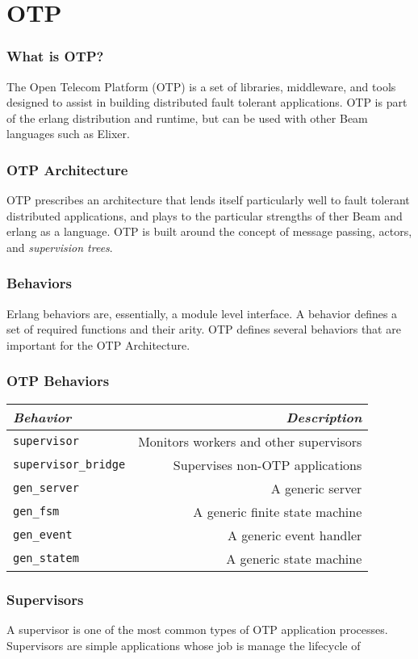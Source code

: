 \documentclass{beamer}
\begin{document}
\section{OTP}

\begin{frame}
  \frametitle{What is OTP?}
  The Open Telecom Platform (OTP) is a set of libraries, middleware,
  and tools designed to assist in building distributed fault tolerant
  applications.  OTP is part of the erlang distribution and runtime,
  but can be used with other Beam languages such as Elixer.
\end{frame}

\begin{frame}
  \frametitle{OTP Architecture}
  OTP prescribes an architecture that lends itself particularly well
  to fault tolerant distributed applications, and plays to the
  particular strengths of ther Beam and erlang as a language.  OTP is
  built around the concept of message passing, actors, and
  \emph{supervision trees}.
\end{frame}

\begin{frame}
  \frametitle{Behaviors}
  Erlang behaviors are, essentially, a module level interface.  A
  behavior defines a set of required functions and their arity.  OTP
  defines several behaviors that are important for the OTP
  Architecture.
\end{frame}

\begin{frame}
  \frametitle{OTP Behaviors}
  \begin{tabular}{|l|r|}
    \hline
    \emph{Behavior} & \emph{Description} \\
    \hline
    {\tt supervisor} & Monitors workers and other supervisors \\
    \hline
    {\tt supervisor\_bridge} & Supervises non-OTP applications \\
    \hline
    {\tt gen\_server} & A generic server \\
    \hline
    {\tt gen\_fsm} & A generic finite state machine \\
    \hline
    {\tt gen\_event} & A generic event handler \\
    \hline
    {\tt gen\_statem} & A generic state machine \\
    \hline
  \end{tabular}
\end{frame}

\begin{frame}
  \frametitle{Supervisors}
  A supervisor is one of the most common types of OTP application
  processes.  Supervisors are simple applications whose job is manage
  the lifecycle of
\end{frame}
\end{document}
